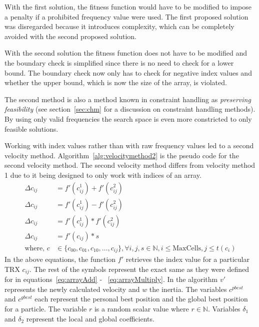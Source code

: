With the first solution, the fitness function would have to be modified to impose a penalty if a prohibited frequency value were used. The first proposed solution was disregarded because it introduces complexity, which can be completely avoided with the second proposed solution.

With the second solution the fitness function does not have to be modified and the boundary check is simplified since there is no need to check for a lower bound. The boundary check now only has to check for negative index values and whether the upper bound, which is now the size of the array, is violated. 

The second method is also a method known in constraint handling as \emph{preserving feasibility} (see section~\ref{sec:chm} for a discussion on constraint handling methods). By using only valid frequencies the search space is even more constricted to only feasible solutions.


Working with index values rather than with raw frequency values led to  a second velocity method. Algorithm~\ref{alg:velocitymethod2} is the pseudo code for the second velocity method. The second velocity method differs from velocity method 1 due to it being designed to only work with indices of an array.
\begin{align}
    \Delta c_{ij} &= f'(c^1_{ij}) + f'(c^2_{ij})\label{eq:arrayAdd2}\\
    \Delta c_{ij} &= f'(c^1_{ij}) - f'(c^2_{ij})\label{eq:arraySubtract2}\\
	\Delta c_{ij} &= f'(c^1_{ij}) * f'(c^2_{ij})\label{eq:arrayMultiply2}\\
    \Delta c_{ij} &= f'(c_{ij}) * s \label{eq:arrayScalar2}\\
    \text{where, }c &\in \{c_{00},c_{01},c_{10}, \dots, c_{ij}\} , \forall i,j,s \in \mathbb{N}, i \leq \text{MaxCells}, j \leq t(c_i)\nonumber
\end{align}
In the above equations, the function $f'$ retrieves the index value for a particular TRX $c_{ij}$. The rest of the symbols represent the exact same as they were defined for in equations~\ref{eq:arrayAdd} - ~\ref{eq:arrayMultiply}.
In the algorithm $v'$ represents the newly calculated velocity and $w$ the inertia. The variables $c^{pbest}$ and $c^{gbest}$ each represent the personal best position and the global best position for a particle. The variable $r$ is a random scalar value where $r \in \mathbb{N}$. Variables $\delta_1$ and $\delta_2$ represent the local and global coefficients.

